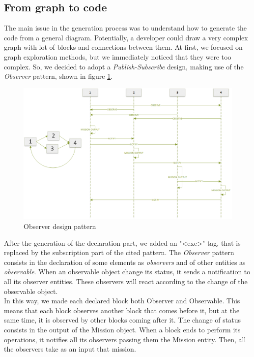 \subsection{From graph to code}\label{graphGen}

The main issue in the generation process was to understand how to generate the code from a general diagram. Potentially, a developer could draw a very complex graph with lot of blocks and connections between them.
At first,  we focused on graph exploration methods, but we immediately noticed that they were too complex.
So, we decided to adopt a \textit{Publish-Subscribe} design, making use of the \textit{Observer} pattern, shown in figure \ref{fig:observerPatter}.

 \begin{figure}[h!]
 \includegraphics[width=\linewidth]
 {pictures/pub_sub.png}
 \caption{Observer design pattern}
 \label{fig:observerPatter}
 \end{figure}

After the generation of the declaration part, we added an "<exe>" tag, that is replaced by the subscription part of the cited pattern. 
The \textit{Observer} pattern consists in the declaration of some elements as \textit{observers} and of other entities as \textit{observable}. 
When an observable object change its status, it sends a notification to all its observer entities. 
These observers will react according to the change of the observable object.
\\

In this way, we made each declared block both Observer and Observable. 
This means that each block observes another block that comes before it, but at the same time, it is observed by other blocks coming after it. 
The change of status consists in the output of the Mission object.
When a block ends to perform its operations, it notifies all its observers passing them the Mission entity. 
Then, all the observers take as an input that mission.
\\

